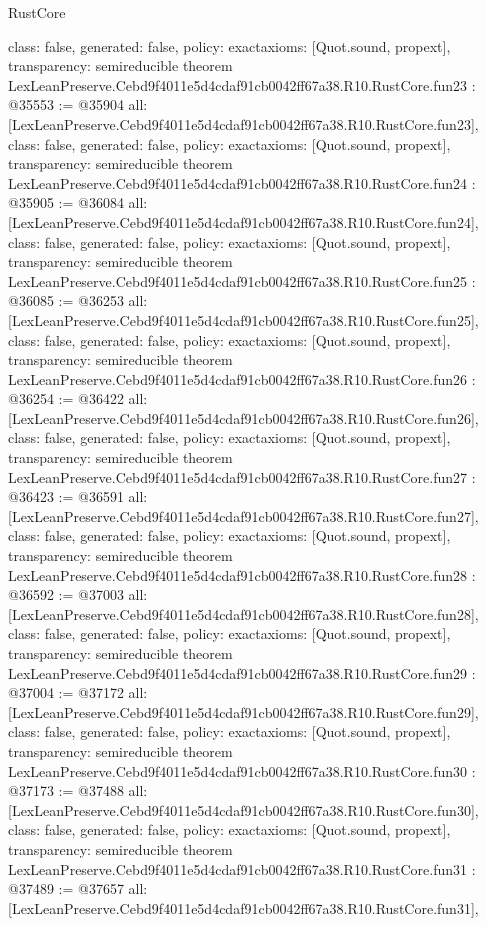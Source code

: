 \begin{lexlean}{RustCore}
\begin{coremodule}
{  class: false,
  generated: false,
  policy: exact{axioms: [Quot.sound, propext]},
  transparency: semireducible
}
theorem LexLeanPreserve.Cebd9f4011e5d4cdaf91cb0042ff67a38.R10.RustCore.fun23 : @35553 := @35904 {
  all: [LexLeanPreserve.Cebd9f4011e5d4cdaf91cb0042ff67a38.R10.RustCore.fun23],
  class: false,
  generated: false,
  policy: exact{axioms: [Quot.sound, propext]},
  transparency: semireducible
}
theorem LexLeanPreserve.Cebd9f4011e5d4cdaf91cb0042ff67a38.R10.RustCore.fun24 : @35905 := @36084 {
  all: [LexLeanPreserve.Cebd9f4011e5d4cdaf91cb0042ff67a38.R10.RustCore.fun24],
  class: false,
  generated: false,
  policy: exact{axioms: [Quot.sound, propext]},
  transparency: semireducible
}
theorem LexLeanPreserve.Cebd9f4011e5d4cdaf91cb0042ff67a38.R10.RustCore.fun25 : @36085 := @36253 {
  all: [LexLeanPreserve.Cebd9f4011e5d4cdaf91cb0042ff67a38.R10.RustCore.fun25],
  class: false,
  generated: false,
  policy: exact{axioms: [Quot.sound, propext]},
  transparency: semireducible
}
theorem LexLeanPreserve.Cebd9f4011e5d4cdaf91cb0042ff67a38.R10.RustCore.fun26 : @36254 := @36422 {
  all: [LexLeanPreserve.Cebd9f4011e5d4cdaf91cb0042ff67a38.R10.RustCore.fun26],
  class: false,
  generated: false,
  policy: exact{axioms: [Quot.sound, propext]},
  transparency: semireducible
}
theorem LexLeanPreserve.Cebd9f4011e5d4cdaf91cb0042ff67a38.R10.RustCore.fun27 : @36423 := @36591 {
  all: [LexLeanPreserve.Cebd9f4011e5d4cdaf91cb0042ff67a38.R10.RustCore.fun27],
  class: false,
  generated: false,
  policy: exact{axioms: [Quot.sound, propext]},
  transparency: semireducible
}
theorem LexLeanPreserve.Cebd9f4011e5d4cdaf91cb0042ff67a38.R10.RustCore.fun28 : @36592 := @37003 {
  all: [LexLeanPreserve.Cebd9f4011e5d4cdaf91cb0042ff67a38.R10.RustCore.fun28],
  class: false,
  generated: false,
  policy: exact{axioms: [Quot.sound, propext]},
  transparency: semireducible
}
theorem LexLeanPreserve.Cebd9f4011e5d4cdaf91cb0042ff67a38.R10.RustCore.fun29 : @37004 := @37172 {
  all: [LexLeanPreserve.Cebd9f4011e5d4cdaf91cb0042ff67a38.R10.RustCore.fun29],
  class: false,
  generated: false,
  policy: exact{axioms: [Quot.sound, propext]},
  transparency: semireducible
}
theorem LexLeanPreserve.Cebd9f4011e5d4cdaf91cb0042ff67a38.R10.RustCore.fun30 : @37173 := @37488 {
  all: [LexLeanPreserve.Cebd9f4011e5d4cdaf91cb0042ff67a38.R10.RustCore.fun30],
  class: false,
  generated: false,
  policy: exact{axioms: [Quot.sound, propext]},
  transparency: semireducible
}
theorem LexLeanPreserve.Cebd9f4011e5d4cdaf91cb0042ff67a38.R10.RustCore.fun31 : @37489 := @37657 {
  all: [LexLeanPreserve.Cebd9f4011e5d4cdaf91cb0042ff67a38.R10.RustCore.fun31],
}
\end{coremodule}
\end{lexlean}

